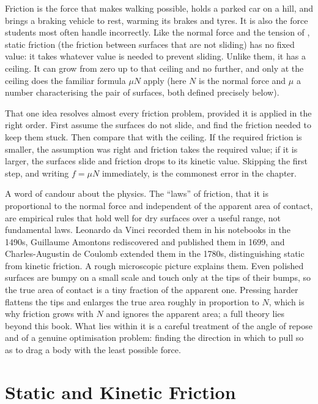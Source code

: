 
Friction is the force that makes walking possible, holds a parked car on a hill, and brings a braking
vehicle to rest, warming its brakes and tyres. It is also the force students most often handle incorrectly. Like the normal force and the tension of
, static friction (the friction between surfaces that are not sliding) has no fixed value: it takes whatever value is needed to prevent
sliding. Unlike them, it has a ceiling. It can grow from zero up to that ceiling and no further, and only
at the ceiling does the familiar formula $\mu N$ apply (here $N$ is the normal force and $\mu$ a
number characterising the pair of surfaces, both defined precisely below).

That one idea resolves almost every friction problem, provided it is applied in the right order.
First assume the surfaces do not slide, and find the friction needed to keep them stuck. Then compare that
with the ceiling. If the required friction is smaller, the assumption was right and friction takes the
required value; if it is larger, the surfaces slide and friction drops to its kinetic value. Skipping the
first step, and writing $f=\mu N$ immediately, is the commonest error in the chapter.

A word of candour about the physics. The ``laws'' of friction, that it is proportional to the normal
force and independent of the apparent area of contact, are empirical rules that hold well for dry
surfaces over a useful range, not fundamental laws. Leonardo da Vinci recorded them in his notebooks
in the 1490s, Guillaume Amontons rediscovered and published them in 1699, and Charles-Augustin de Coulomb
extended them in the 1780s, distinguishing static from kinetic friction. A rough microscopic picture
explains them. Even polished surfaces are bumpy on a small scale and touch only at the tips of their
bumps, so the true area of contact is a tiny fraction of the apparent one. Pressing harder flattens the
tips and enlarges the true area roughly in proportion to $N$, which is why friction grows with $N$ and
ignores the apparent area; a full theory lies beyond this book. What lies
within it is a careful treatment of the angle of repose and of a genuine optimisation problem: finding
the direction in which to pull so as to drag a body with the least possible force.

\section{Static and Kinetic Friction}

